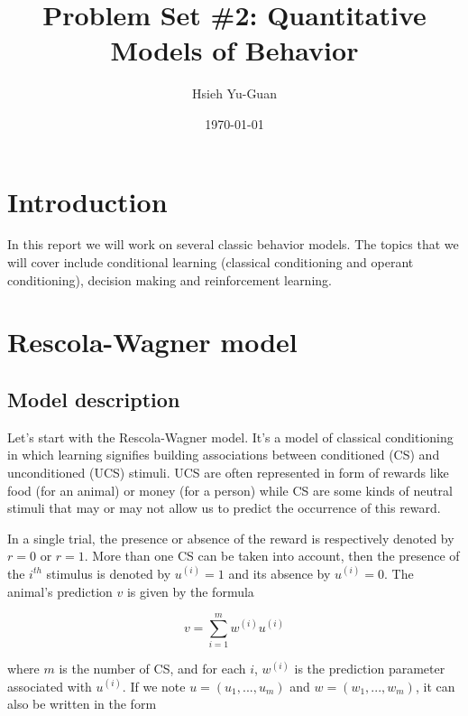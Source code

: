 

\pagestyle{fancy} 
\rfoot{\thepage}
\cfoot{}
\lfoot{~\theauthor}
\renewcommand{\headrulewidth}{0.4pt}
\renewcommand{\footrulewidth}{0.4pt}


\title{Problem Set \#2: Quantitative Models of Behavior \vspace{-0.5em}}
\author{Hsieh Yu-Guan}
\date{\today}
\maketitle

\thispagestyle{fancy}


\section*{Introduction}

In this report we will work on several classic behavior models. The topics 
that we will cover include conditional learning (classical conditioning and
operant conditioning), decision making and reinforcement learning.


\section{Rescola-Wagner model}

\subsection{Model description}

Let's start with the Rescola-Wagner model. It's a model of classical
conditioning in which learning signifies building associations between 
conditioned (CS) and unconditioned (UCS) stimuli. UCS are often represented in
form of rewards like food (for an animal) or money (for a person) while CS are 
some kinds of neutral stimuli that may or may not allow us to predict the
occurrence of this reward.

In a single trial, the presence or absence of the reward is respectively 
denoted by $r = 0$ or $r = 1$. More than one CS can be taken into account, 
then the presence of the $i^{th}$ stimulus is denoted by $u^{(i)} = 1$ and its 
absence by $u^{(i)} = 0$. The animal's prediction $v$ is given by the 
formula

\[v = \sum_{i = 1}^m w^{(i)}u^{(i)}\]

\noindent
where $m$ is the number of CS, and for each $i$, $w^{(i)}$ is the prediction 
parameter associated with $u^{(i)}$. If we note $u = (u_1, ..., u_m)$ and 
$w = (w_1, ..., w_m)$, it can also be written in the form 

